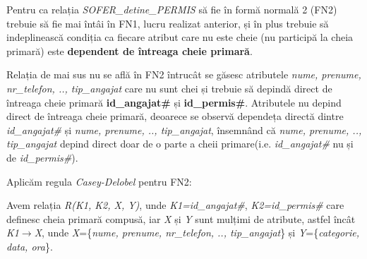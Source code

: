 \documentclass[12pt, a4paper]{article}
\begin{document}
\begin{table}[!htbp]
\caption{Transformarea în FN1}\label{tab2}
\end{table}

Pentru ca relația \emph{SOFER\_detine\_PERMIS} să fie în formă normală 2 (FN2) trebuie să fie mai întâi în FN1, lucru realizat anterior, și în plus trebuie să indeplinească condiția ca fiecare atribut care nu este cheie (nu participă la cheia primară) este \textbf{dependent de întreaga cheie primară}.

Relația de mai sus nu se află în FN2 întrucât se găsesc atributele \emph{nume, prenume, nr\_telefon, .., tip\_angajat} care nu sunt chei și trebuie să depindă direct de întreaga cheie primară \textbf{id\_angajat\#} și \textbf{id\_permis\#}. Atributele nu depind direct de întreaga cheie primară, deoarece se observă dependeța directă dintre \emph{id\_angajat\#} și \emph{nume, prenume, .., tip\_angajat}, însemnând că \emph{nume, prenume, .., tip\_angajat} depind direct doar de o parte a cheii primare(i.e. \emph{id\_angajat\#} nu și de \emph{id\_permis\#}).

Aplicăm regula \emph{Casey-Delobel} pentru FN2:

Avem relația \emph{R(K1, K2, X, Y)}, unde \emph{K1=id\_angajat\#}, \emph{K2=id\_permis\#} care definesc cheia primară compusă, iar \emph{X} și \emph{Y} sunt mulțimi de atribute, astfel încât \emph{K1}$\rightarrow$\emph{X}, unde \emph{X}=\{\emph{nume, prenume, nr\_telefon, .., tip\_angajat}\} și \emph{Y}=\{\emph{categorie, data, ora}\}.
\end{document}
